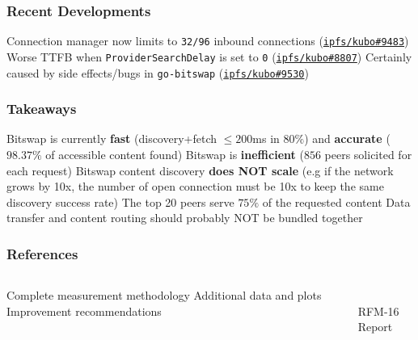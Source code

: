 \documentclass{../pl-slide}
\begin{document}
\begin{frame}
\frametitle{Recent Developments}

\begin{itemize}
	\itemc Connection manager now limits to \texttt{32/96} inbound connections (\href{https://github.com/ipfs/kubo/pull/9483}{\texttt{ipfs/kubo\#9483}})
	\itemc Worse TTFB when \texttt{ProviderSearchDelay} is set to \texttt{0} (\href{https://github.com/ipfs/kubo/issues/8807}{\texttt{ipfs/kubo\#8807}})
	\itemc Certainly caused by side effects/bugs in \texttt{go-bitswap} (\href{https://github.com/ipfs/kubo/pull/9530}{\texttt{ipfs/kubo\#9530}})
\end{itemize}
\end{frame}

\begin{frame}
\frametitle{Takeaways}
\begin{itemize}
        \itemc Bitswap is currently \textbf{fast} (discovery+fetch $\leq 200$ms in $80\%$) and \textbf{accurate} ($98.37\%$ of accessible content found)
        \itemc Bitswap is \textbf{inefficient} ($856$ peers solicited for each request)
        \itemc Bitswap content discovery \textbf{does NOT scale} (e.g if the network grows by 10x, the number of open connection must be 10x to keep the same discovery success rate)
        \itemc The top 20 peers serve $75\%$ of the requested content
        \bigskip
        \itemc Data transfer and content routing should probably NOT be bundled together
\end{itemize}
\end{frame}

\begin{frame}
\frametitle{References}
\begin{columns}[onlytextwidth]
\begin{column}{0.60\textwidth}
\begin{itemize}
        \itemc Complete measurement methodology
        \itemc Additional data and plots
        \itemc Improvement recommendations
\end{itemize}
\end{column}
\begin{column}{0.38\textwidth}
\begin{center}
\\
\medskip
RFM-16 Report
\bigskip
\end{center}
\end{column}
\end{columns}

\end{frame}
\end{document}
